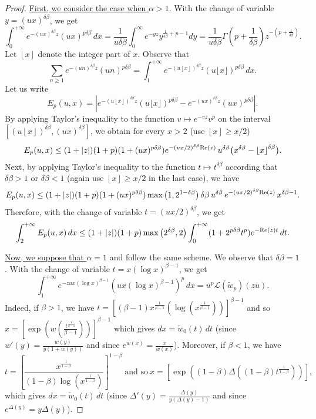 \documentclass[oneside, a4paper,11pt,reqno]{amsart}
\begin{document}
\begin{proof}
\underline{First, we consider the case when $\alpha>1$}. 
With the change of variable $y=(ux)^{\delta\beta}$, we get
$$\int_{0}^{+\infty}e^{-(ux)^{\delta\beta}z}(ux)^{p\delta\beta}\, dx = 
    \frac {1} {u\delta\beta } \int_0^{\infty} e^{-yz} y^{\frac{1}{\delta\beta}
      +p -1} dy =\frac 1{u\delta\beta} \Gamma \left(p+\frac{1}{\delta\beta}\right) 
   z^{-(p+\frac{1}{\delta\beta})}.$$
Let ${\left\lfloor {{x}} \right\rfloor}$ denote the integer part of $x$. Observe that
$$ \sum_{n\ge 1} e^{-(un)^{\delta\beta}z}(un)^{p\delta\beta}=\int_{1}^{+\infty}
     e^{-(u{\left\lfloor {{x}} \right\rfloor})^{\delta\beta}z}(u\lfloor x\rfloor)^{p\delta\beta}\, dx.$$
Let us write
$$E_p(u,x)=\left| e^{-(u{\left\lfloor {{x}} \right\rfloor})^{\delta\beta}z} (u\lfloor x\rfloor)^{p\delta\beta}
   -e^{-(ux)^{\delta\beta}z}(ux)^{p\delta\beta}\right|.$$
By applying Taylor's inequality to the function $v\mapsto e^{-vz} v^p$
 on the interval $[(u{\left\lfloor {{x}} \right\rfloor})^{\delta\beta},(ux)^{\delta\beta}]$, 
we obtain for every $x>2$ (use ${\left\lfloor {{x}} \right\rfloor} \geq x/2$) 
$$E_p(u,x) \le
 (1+|z|)(1+p)(1+(ux)^{p\delta\beta}) e^{-(ux/2)^{\delta\beta}\text{\rm Re}(z)}
   \, u^{\delta\beta}\big(x^{\delta\beta} - {\left\lfloor {{x}} \right\rfloor}^{\delta\beta}\big).$$
Next, by applying Taylor's inequality to the function $t\mapsto t^{\delta\beta}$ 
according that $\delta\beta>1$ or $\delta\beta<1$ 
(again use ${\left\lfloor {{x}} \right\rfloor} \geq x/2$ in the last case), we have 
$$ E_p(u,x) \le (1+|z|) (1+p)(1+(ux)^{p\delta\beta})
   \max\big(1,2^{1-\delta\beta}\big)\, \delta\beta\, u^{\delta\beta}\, 
   e^{-(ux/2)^{\delta\beta} \text{\rm Re}(z)}\, x^{\delta\beta-1}.$$
Therefore, with the change of variable $t=(ux/2)^{\delta\beta}$,
we get
$$\int_2^{+\infty} E_p(u,x) \, dx
    \le (1+|z|) (1+p)
    \max\big(2^{\delta\beta} , 2\big) \int_0^{+\infty}(1+2^{p\delta\beta}t^p) 
    e^{-\text{\rm Re}(z) t}\, dt .$$

\underline{Now, we suppose that $\alpha=1$} and follow the same scheme. We observe that $\delta\beta=1$.
With the change of variable $t=x(\log x)^{\beta-1}$, we get
$$\int_{1}^{+\infty}e^{-zux(\log x)^{\beta-1}}(ux(\log x)^{\beta-1})^p\, dx=u^p{\mathcal L}(\tilde w_p)(zu). $$
Indeed, if $\beta>1$, 
we have $t=[(\beta-1)x^{\frac 1{\beta-1}}(\log (x^{\frac 1{\beta-1}}))]^{\beta-1}$
and so $x=\left[\exp\left(w\left(\frac{t^{\frac 1{\beta-1}}}{\beta-1}\right)\right)\right]^{\beta-1}$ which gives
$dx=\tilde w_0(t)\, dt$
(since $w'(y)=\frac{w(y)}{y(1+w(y))}$ and since $e^{w(x)}=\frac{x}{w(x)}$).
Moreover, if $\beta<1$, we have
$$t=\left[\frac{x^{\frac 1{1-\beta}}}  {(1-\beta)\log (x^{\frac 1{1-\beta}})}\right]^{1-\beta}
\ \mbox{and so}\ x=\left[\exp\left((1-\beta)\Delta\left((1-\beta)t^{\frac 1{1-\beta}}
\right)\right)\right],$$
which gives
$dx=\tilde w_0(t)\, dt$
(since $\Delta'(y)=\frac{\Delta(y)}{y(\Delta(y)-1)}$ and since $e^{\Delta(y)}=y\Delta(y)$).


\end{proof}
\end{document}
